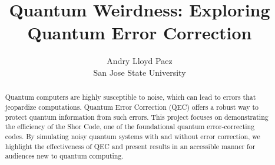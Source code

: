 \documentclass[10pt]{article}
\title{Quantum Weirdness:  Exploring Quantum Error Correction}
\author{Andry Lloyd Paez \\ San Jose State University}
\date{}
\begin{document}
\maketitle

\begin{abstract}
Quantum computers are highly susceptible to noise, which can lead to errors that jeopardize computations. Quantum Error Correction (QEC) offers a robust way to protect quantum information from such errors. This project focuses on demonstrating the efficiency of the Shor Code, one of the foundational quantum error-correcting codes. By simulating noisy quantum systems with and without error correction, we highlight the effectiveness of QEC and present results in an accessible manner for audiences new to quantum computing.
\end{abstract}
\end{document}

